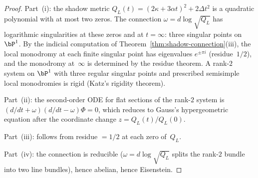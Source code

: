 \begin{proof}
Part~(i): the shadow metric $Q_L(t)
= (2\kappa + 3\alpha t)^2 + 2\Delta t^2$ is a quadratic
polynomial with at most two zeros. The connection
$\omega = d\log\sqrt{Q_L}$ has logarithmic singularities
at these zeros and at $t = \infty$: three singular points
on~$\bP^1$. By the indicial computation of
Theorem~\ref{thm:shadow-connection}(iii),
the local monodromy at each finite singular point has
eigenvalues $e^{\pm \pi i}$ (residue~$1/2$), and the
monodromy at~$\infty$ is determined by the residue theorem.
A rank-$2$ system on $\bP^1$ with three regular singular
points and prescribed semisimple local monodromies is rigid
(Katz's rigidity theorem).

Part~(ii): the second-order ODE for flat sections of the
rank-$2$ system is $(d/dt + \omega)(d/dt - \omega)\Phi = 0$,
which reduces to Gauss's hypergeometric equation after the
coordinate change $z = Q_L(t)/Q_L(0)$.

Part~(iii): follows from residue $= 1/2$ at each zero
of~$Q_L$.

Part~(iv): the connection is reducible
($\omega = d\log\sqrt{Q_L}$ splits the rank-$2$ bundle
into two line bundles), hence abelian, hence Eisenstein.
\end{proof}

